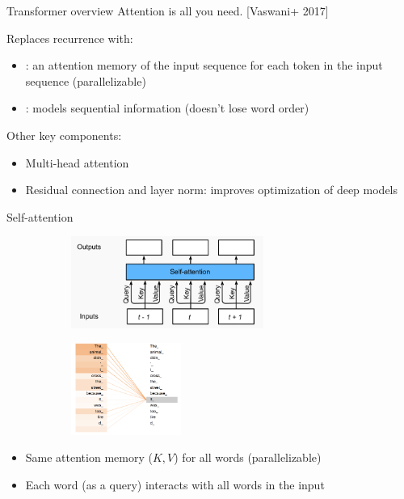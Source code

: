 \documentclass[usenames,dvipsnames,notes]{beamer}
\begin{document}
\begin{frame}
    {Transformer overview}
    Attention is all you need. [Vaswani+ 2017]

    Replaces recurrence with:\\
    \begin{itemize}
        \item {}: an attention memory of the input sequence for each token in the input sequence (parallelizable)
        \item {}: models sequential information (doesn't lose word order)
    \end{itemize}

    Other key components:\\
    \begin{itemize}
        \item Multi-head attention
        \item Residual connection and layer norm: improves optimization of deep models
    \end{itemize}
\end{frame}

\begin{frame}
    {Self-attention}
    \begin{figure}
        \begin{subfigure}{.5\textwidth}
        \includegraphics[height=3cm]{figures/self-attn}
        \end{subfigure}
        \begin{subfigure}{.4\textwidth}
        \includegraphics[height=3cm]{figures/self-attn-ex}
        \end{subfigure}
    \end{figure}
    \begin{itemize}
        \item Same attention memory ($K, V$) for all words (parallelizable)
        \item Each word (as a query) interacts with all words in the input
    \end{itemize}
\end{frame}
\end{document}
